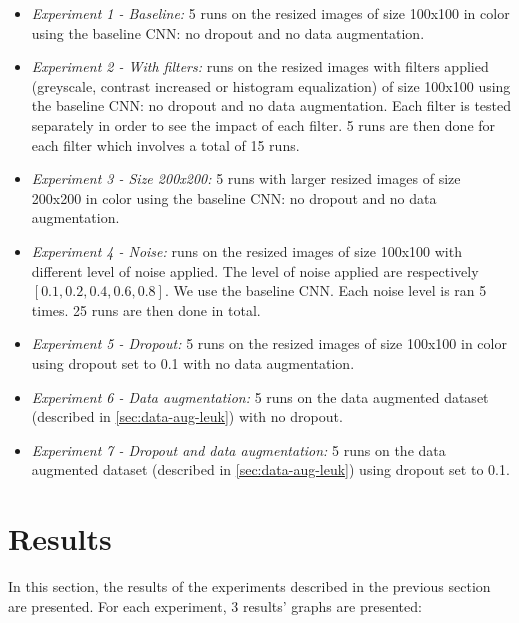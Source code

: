 \documentclass[11pt, openany]{report}
\theoremstyle{plain}
\theoremstyle{definition}
\theoremstyle{remark}
\begin{document}
\begin{itemize}
\item \textit{Experiment 1 - Baseline:} 5 runs on the resized images of size 100x100 in color using the baseline CNN: no dropout and no data augmentation.  

\item \textit{Experiment 2 - With filters:} runs on the resized images with filters applied (greyscale, contrast increased or histogram equalization) of size 100x100 using the baseline CNN: no dropout and no data augmentation. Each filter is tested separately in order to see the impact of each filter. 5 runs are then done for each filter which involves a total of 15 runs.

\item \textit{Experiment 3 - Size 200x200:} 5 runs with larger resized images of size 200x200 in color using the baseline CNN: no dropout and no data augmentation.   

\item \textit{Experiment 4 - Noise:} runs on the resized images of size 100x100 with different level of noise applied. The level of noise applied are respectively $[0.1, 0.2, 0.4, 0.6, 0.8]$. We use the baseline CNN.  Each noise level is ran 5 times. 25 runs are then done in total. 

\item \textit{Experiment 5 - Dropout:} 5 runs on the resized images of size 100x100 in color using dropout set to 0.1 with no data augmentation. 
 
\item \textit{Experiment 6 - Data augmentation:} 5 runs on the data augmented dataset (described in \autoref{sec:data-aug-leuk}) with no dropout.   

\item \textit{Experiment 7 - Dropout and data augmentation:} 5 runs on the data augmented dataset (described in \autoref{sec:data-aug-leuk}) using dropout set to 0.1. 


\end{itemize}


\section{Results}

In this section, the results of the experiments described in the previous section are presented. For each experiment, 3 results' graphs are presented: 
\end{document}
